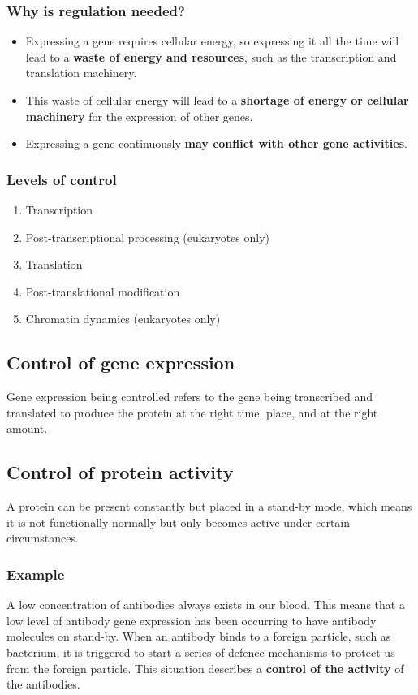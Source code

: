 \documentclass[11pt]{article}
\begin{document}
\subsubsection{Why is regulation needed?}
\label{sec:orgb7ec35a}
\begin{itemize}
\item Expressing a gene requires cellular energy, so expressing it all the time will lead to a \textbf{waste of energy and resources}, such as the transcription and translation machinery.
\item This waste of cellular energy will lead to a \textbf{shortage of energy or cellular machinery} for the expression of other genes.
\item Expressing a gene continuously \textbf{may conflict with other gene activities}.
\end{itemize}
\subsubsection{Levels of control}
\label{sec:org3af0fac}
\begin{enumerate}
\item Transcription
\item Post-transcriptional processing (eukaryotes only)
\item Translation
\item Post-translational modification
\item Chromatin dynamics (eukaryotes only)
\end{enumerate}
\subsection{Control of gene expression}
\label{sec:orga6938ee}
Gene expression being controlled refers to the gene being transcribed and translated to produce the protein at the right time, place, and at the right amount.

\newpage
\subsection{Control of protein activity}
\label{sec:org884f670}
A protein can be present constantly but placed in a stand-by mode, which means it is not functionally normally but only becomes active under certain circumstances.
\subsubsection{Example}
\label{sec:orgf800b3f}
A low concentration of antibodies always exists in our blood. This means that a low level of antibody gene expression has been occurring to have antibody molecules on stand-by. When an antibody binds to a foreign particle, such as bacterium, it is triggered to start a series of defence mechanisms to protect us from the foreign particle. This situation describes a \textbf{control of the activity} of the antibodies.
\end{document}
